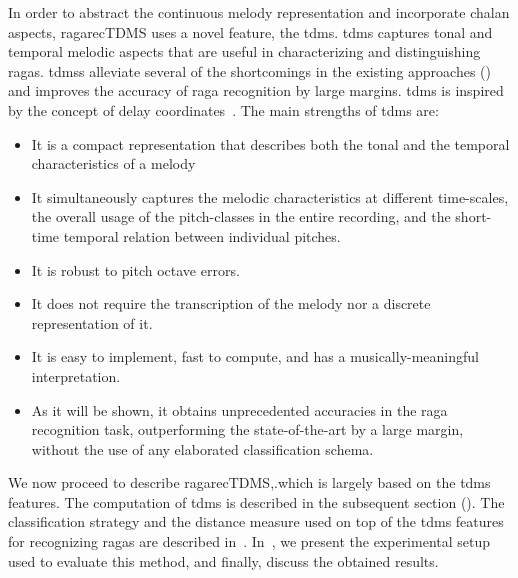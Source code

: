 In order to abstract the continuous melody representation and incorporate \gls{chalan} aspects, \acrshort{ragarecTDMS} uses a novel feature,  the \acrfull{tdms}. \gls{tdms} captures tonal and temporal melodic aspects that are useful in characterizing and distinguishing \glspl{raga}. \Glspl{tdms} alleviate several of the shortcomings in the existing approaches () and improves the accuracy of \gls{raga} recognition by large margins. \Gls{tdms} is inspired by the concept of delay coordinates~\citep{takens1981detecting}. The main strengths of \gls{tdms} are:

\begin{itemize}
	\item It is a compact representation that describes both the tonal and the temporal characteristics of a melody
	\item It simultaneously captures the melodic characteristics at different time-scales, the overall usage of the pitch-classes in the entire recording, and the short-time temporal relation between individual pitches.
	\item It is robust to pitch octave errors.
	\item It does not require the transcription of the melody nor a discrete representation of it.
	\item It is easy to implement, fast to compute, and has a musically-meaningful interpretation.
	\item As it will be shown, it obtains unprecedented accuracies in the raga recognition task, outperforming the state-of-the-art by a large margin, without the use of any elaborated classification schema.
\end{itemize}

We now proceed to describe \acrshort{ragarecTDMS},.which is largely based on the \gls{tdms} features. The computation of \gls{tdms} is described in the subsequent section (). The classification strategy and the distance measure used on top of the \gls{tdms} features for recognizing \glspl{raga} are described in~. In~, we present the experimental setup used to evaluate this method, and finally, discuss the obtained results. 

\subsection{}
\label{sec:tdms_feature_extraction}


